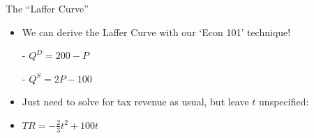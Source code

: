 \documentclass[9pt, handout]{beamer}
\begin{document}
\begin{frame}{The ``Laffer Curve''}
    \begin{itemize}
        \item We can derive the Laffer Curve with our `Econ 101' technique!
    \end{itemize}
    \vspace{5pt}
    \begin{itemize}
        \item[-] $Q^D = 200-P$
        \item[-] $Q^S = 2P-100$
    \end{itemize}
    \vspace{10pt}
    \begin{itemize}
        \item Just need to solve for tax revenue as usual, but leave $t$ unspecified:
        \vspace{5pt}
        \item $TR = -\frac{2}{3}t^2 + 100 t$
    \end{itemize}
\end{frame}


\end{document}
